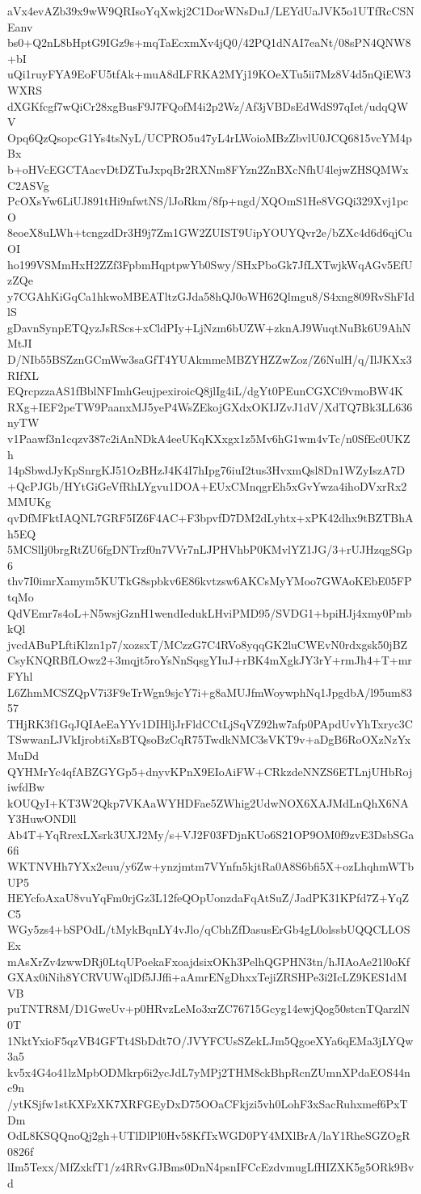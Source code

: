 aVx4evAZb39x9wW9QRIsoYqXwkj2C1DorWNsDuJ/LEYdUaJVK5o1UTfRcCSNEanv
bs0+Q2nL8bHptG9IGz9s+mqTaEcxmXv4jQ0/42PQ1dNAI7eaNt/08sPN4QNW8+bI
uQi1ruyFYA9EoFU5tfAk+muA8dLFRKA2MYj19KOeXTu5ii7Mz8V4d5nQiEW3WXRS
dXGKfcgf7wQiCr28xgBusF9J7FQofM4i2p2Wz/Af3jVBDsEdWdS97qIet/udqQWV
Opq6QzQsopcG1Ys4tsNyL/UCPRO5u47yL4rLWoioMBzZbvlU0JCQ6815vcYM4pBx
b+oHVcEGCTAacvDtDZTuJxpqBr2RXNm8FYzn2ZnBXcNfhU4lejwZHSQMWxC2ASVg
PcOXsYw6LiUJ891tHi9nfwtNS/lJoRkm/8fp+ngd/XQOmS1He8VGQi329Xvj1pcO
8eoeX8uLWh+tcngzdDr3H9j7Zm1GW2ZUIST9UipYOUYQvr2e/bZXc4d6d6qjCuOI
ho199VSMmHxH2ZZf3FpbmHqptpwYb0Swy/SHxPboGk7JfLXTwjkWqAGv5EfUzZQe
y7CGAhKiGqCa1hkwoMBEATltzGJda58hQJ0oWH62Qlmgu8/S4xng809RvShFIdlS
gDavnSynpETQyzJsRScs+xCldPIy+LjNzm6bUZW+zknAJ9WuqtNuBk6U9AhNMtJI
D/NIb55BSZznGCmWw3saGfT4YUAkmmeMBZYHZZwZoz/Z6NulH/q/IlJKXx3RIfXL
EQrcpzzaAS1fBblNFImhGeujpexiroicQ8jlIg4iL/dgYt0PEunCGXCi9vmoBW4K
RXg+IEF2peTW9PaanxMJ5yeP4WsZEkojGXdxOKIJZvJ1dV/XdTQ7Bk3LL636nyTW
v1Paawf3n1cqzv387c2iAnNDkA4eeUKqKXxgx1z5Mv6hG1wm4vTc/n0SfEc0UKZh
14pSbwdJyKpSnrgKJ51OzBHzJ4K4I7hIpg76iuI2tus3HvxmQsl8Dn1WZyIszA7D
+QcPJGb/HYtGiGeVfRhLYgvu1DOA+EUxCMnqgrEh5xGvYwza4ihoDVxrRx2MMUKg
qvDfMFktIAQNL7GRF5IZ6F4AC+F3bpvfD7DM2dLyhtx+xPK42dhx9tBZTBhAh5EQ
5MCSllj0brgRtZU6fgDNTrzf0n7VVr7nLJPHVhbP0KMvlYZ1JG/3+rUJHzqgSGp6
thv7I0imrXamym5KUTkG8spbkv6E86kvtzsw6AKCsMyYMoo7GWAoKEbE05FPtqMo
QdVEmr7s4oL+N5wsjGznH1wendIedukLHviPMD95/SVDG1+bpiHJj4xmy0PmbkQl
jvcdABuPLftiKlzn1p7/xozsxT/MCzzG7C4RVo8yqqGK2luCWEvN0rdxgsk50jBZ
CsyKNQRBfLOwz2+3mqjt5roYsNnSqsgYIuJ+rBK4mXgkJY3rY+rmJh4+T+mrFYhl
L6ZhmMCSZQpV7i3F9eTrWgn9sjcY7i+g8aMUJfmWoywphNq1JpgdbA/l95um8357
THjRK3f1GqJQIAeEaYYv1DIHljJrFldCCtLjSqVZ92hw7afp0PApdUvYhTxryc3C
TSwwanLJVkIjrobtiXsBTQsoBzCqR75TwdkNMC3sVKT9v+aDgB6RoOXzNzYxMuDd
QYHMrYc4qfABZGYGp5+dnyvKPnX9EIoAiFW+CRkzdeNNZS6ETLnjUHbRojiwfdBw
kOUQyI+KT3W2Qkp7VKAaWYHDFae5ZWhig2UdwNOX6XAJMdLnQhX6NAY3HuwONDll
Ab4T+YqRrexLXsrk3UXJ2My/s+VJ2F03FDjnKUo6S21OP9OM0f9zvE3DsbSGa6fi
WKTNVHh7YXx2euu/y6Zw+ynzjmtm7VYnfn5kjtRa0A8S6bfi5X+ozLhqhmWTbUP5
HEYcfoAxaU8vuYqFm0rjGz3L12feQOpUonzdaFqAtSuZ/JadPK31KPfd7Z+YqZC5
WGy5zs4+bSPOdL/tMykBqnLY4vJlo/qCbhZfDasusErGb4gL0olssbUQQCLLOSEx
mAsXrZv4zwwDRj0LtqUPoekaFxoajdsixOKh3PelhQGPHN3tn/hJIAoAe21l0oKf
GXAx0iNih8YCRVUWqlDf5JJffi+aAmrENgDhxxTejiZRSHPe3i2IcLZ9KES1dMVB
puTNTR8M/D1GweUv+p0HRvzLeMo3xrZC76715Gcyg14ewjQog50stcnTQarzlN0T
1NktYxioF5qzVB4GFTt4SbDdt7O/JVYFCUsSZekLJm5QgoeXYa6qEMa3jLYQw3a5
kv5x4G4o41lzMpbODMkrp6i2ycJdL7yMPj2THM8ckBhpRcnZUmnXPdaEOS44nc9n
/ytKSjfw1stKXFzXK7XRFGEyDxD75OOaCFkjzi5vh0LohF3xSacRuhxmef6PxTDm
OdL8KSQQnoQj2gh+UTlDlPl0Hv58KfTxWGD0PY4MXlBrA/laY1RheSGZOgR0826f
lIm5Texx/MfZxkfT1/z4RRvGJBms0DnN4psnIFCcEzdvmugLfHIZXK5g5ORk9Bvd

